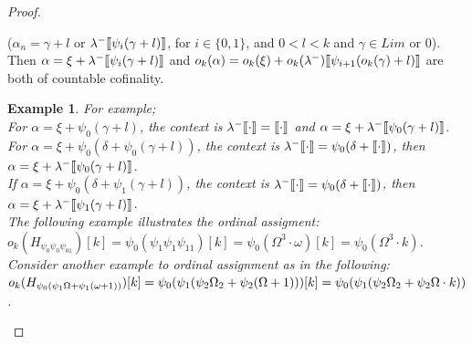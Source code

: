 \documentclass{amsart}
\theoremstyle{plain}
\theoremstyle{plain}
\newtheorem{example}[theorem]{Example}
\def\scbrl{[\hspace{-.14em}[}
\def\scbrr{]\hspace{-.14em}]}
\def\scbr#1{\scbrl#1\scbrr}
\newcommand{\Om}{{\Omega}}
\newcommand{\ok}{o_{k}}
\newcommand{\al}{{\alpha}}
\newcommand{\ga}{\gamma}
\newcommand{\de}{\delta}
\newcommand{\la}{\lambda}
\newcommand{\om}{\omega}
\def\scbrl{[\hspace{-.14em}[}
\def\scbrr{]\hspace{-.14em}]}
\def\scbr#1{\scbrl#1\scbrr}
\begin{document}
\begin{proof}
\begin{Cases}
\begin{Cases}
\begin{Cases}
            \item \label{CaseSucc}($\al_n = \ga+l$ or $\la^-\scbr{\psi_i(\ga+l)}$, for $i\in \{0,1\}$, and $0<l<k$ and  $\ga\in Lim$ or $0$).\smallskip
            \\
            Then $\al= \xi+ \la^-\scbr{\psi_i(\ga+l)}$ and $\ok(\al) = \ok(\xi) + \ok(\la^-)\scbr{\psi_{i+1}(\ok(\ga)+l)}$ are both of countable cofinality.
            \\
            \begin{example}
                For example; \\
                For $\al=\xi+\psi_0(\ga+l)$, the context is 
                $\la^-\scbr{\cdot}=\scbr{\cdot}$ and $\al=\xi +\la^-\scbr{\psi_0(\ga+l)}$.
                \\
                For $\al = \xi+\psi_0(\de+\psi_0(\ga+l))$, the context is $\la^-\scbr{\cdot} = \psi_0(\de + \scbr{\cdot})$, then $\al= \xi +\la^-\scbr{\psi_0(\ga+l)}$.
                \\
                If $\al = \xi + \psi_0(\de + \psi_1(\ga+l))$, the context is $\la^-\scbr{\cdot} = \psi_0(\de + \scbr{\cdot})$, then
                $\al= \xi+ \la^-\scbr{\psi_1(\ga+l)}$.
                \medskip
                \\
                The following example illustrates the ordinal assigment:\\
                $\ok(H_{\psi_0\psi_0\psi_01})[k]= \psi_0(\psi_1\psi_1\psi_11)[k] = \psi_0(\Om^3\cdot \om)[k]= \psi_0(\Om^3 \cdot k)$.
                \\
                Consider another example to ordinal assignment as in the following: \\
                $\ok(H_{\psi_0(\psi_1\Om + \psi_1(\om+1))})[k] = \psi_0(\psi_1(\psi_2\Om_2+ \psi_2(\Om+1)))[k]\\=
                \psi_0(\psi_1(\psi_2\Om_2 + \psi_2\Om\cdot k))$. 
            \end{example}
            

\end{Cases}
\end{Cases}
\end{Cases}
\end{proof}
\end{document}
